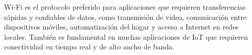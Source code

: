 Wi-Fi es el protocolo preferido para aplicaciones que requieren transferencias rápidas y confiables de datos, como transmisión de video, comunicación entre dispositivos móviles, automatización del hogar y acceso a Internet en redes locales. También es fundamental en muchas aplicaciones de IoT que requieren conectividad en tiempo real y de alto ancho de banda.